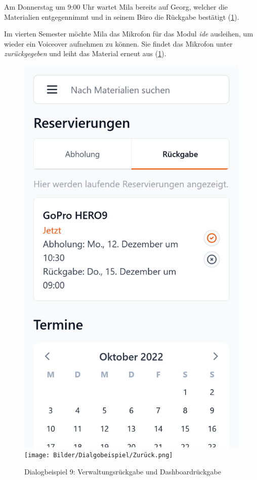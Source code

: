 Am Donnerstag um 9:00 Uhr wartet Mila bereits auf Georg, welcher die
Materialien entgegennimmt und in seinem Büro die Rückgabe bestätigt (\ref{fig:zuruck}).

Im vierten Semester möchte Mila das Mikrofon für das Modul \textit{\ac{ide}}
ausleihen, um wieder ein Voiceover aufnehmen zu können. Sie findet das Mikrofon
unter \textit{zurückgegeben} und leiht das Material erneut aus (\ref{fig:zuruck}).
\begin{figure}[h]
    \centering
    \includegraphics[scale=0.14]{Bilder/Dialgobeispiel/Altes Datum.png}\hspace{1em}
    \texttt{[image: Bilder/Dialgobeispiel/Zurück.png]}\hspace{1em}
    \caption{Dialogbeispiel 9: Verwaltungsrückgabe und Dashboardrückgabe}\label{fig:zuruck}
\end{figure}
